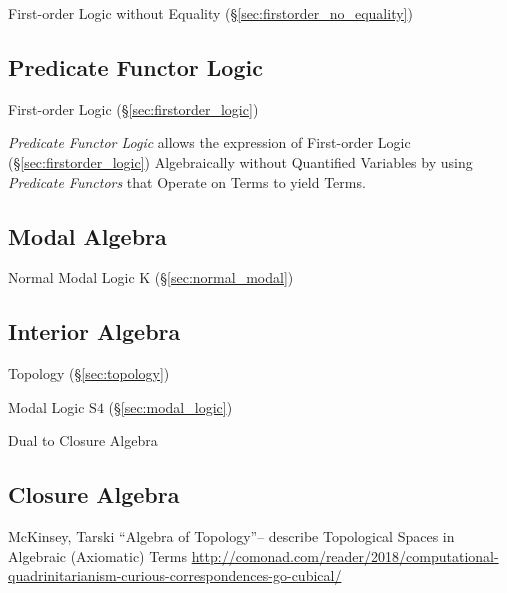 First-order Logic without Equality
(\S\ref{sec:firstorder_no_equality})



\subsection{Predicate Functor Logic}\label{sec:pfl}

First-order Logic (\S\ref{sec:firstorder_logic})

\emph{Predicate Functor Logic} allows the expression of First-order
Logic (\S\ref{sec:firstorder_logic}) Algebraically without Quantified
Variables by using \emph{Predicate Functors} that Operate on Terms to
yield Terms.



\subsection{Modal Algebra}\label{sec:modal_algebra}

Normal Modal Logic $\mathrm{K}$ (\S\ref{sec:normal_modal})



\subsection{Interior Algebra}\label{sec:interior_algebra}

Topology (\S\ref{sec:topology})

Modal Logic $\mathrm{S4}$ (\S\ref{sec:modal_logic})

Dual to Closure Algebra



\subsection{Closure Algebra}\label{sec:closure_algebra}

McKinsey, Tarski ``Algebra of Topology''-- describe Topological Spaces in
Algebraic (Axiomatic) Terms
\url{http://comonad.com/reader/2018/computational-quadrinitarianism-curious-correspondences-go-cubical/}

